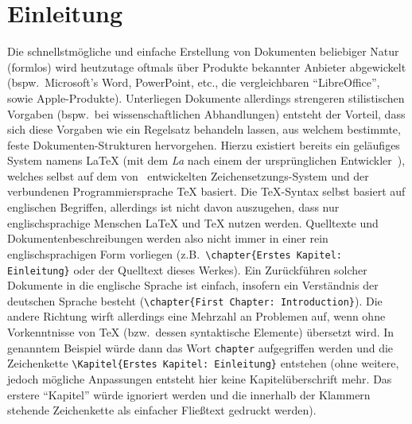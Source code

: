 \section{Einleitung}
Die schnellstmögliche und einfache Erstellung von Dokumenten beliebiger Natur (formlos) wird heutzutage oftmals über Produkte bekannter Anbieter abgewickelt (bspw.\ Microsoft's Word, PowerPoint, etc., die vergleichbaren \enquote{LibreOffice}, sowie Apple-Produkte).
Unterliegen Dokumente allerdings strengeren stilistischen Vorgaben (bspw.\ bei wissenschaftlichen Abhandlungen) entsteht der Vorteil, dass sich diese Vorgaben wie ein Regelsatz behandeln lassen, aus welchem bestimmte, feste Dokumenten-Strukturen hervorgehen. Hierzu existiert bereits ein geläufiges System namens \LaTeX{} (mit dem \textit{La} nach einem der ursprünglichen Entwickler~\cite{latexCompanion:leslieLamport}), welches selbst auf dem von~\cite{texbook} entwickelten Zeichensetzungs-System und der verbundenen Programmiersprache \TeX{} basiert.
Die \TeX{}-Syntax selbst basiert auf englischen Begriffen, allerdings ist nicht davon auszugehen, dass nur englischsprachige Menschen \LaTeX{} und \TeX{} nutzen werden. Quelltexte und Dokumentenbeschreibungen werden also nicht immer in einer rein englischsprachigen Form vorliegen (z.B.\ \verb|\chapter{Erstes Kapitel: Einleitung}| oder der Quelltext dieses Werkes). 
Ein Zurückführen solcher Dokumente in die englische Sprache ist einfach, insofern ein Verständnis der deutschen Sprache besteht (\verb|\chapter{First Chapter: Introduction}|). 
Die andere Richtung wirft allerdings eine Mehrzahl an Problemen auf, wenn ohne Vorkenntnisse von \TeX{} (bzw.\ dessen syntaktische Elemente) übersetzt wird. In genanntem Beispiel würde dann das Wort \texttt{chapter} aufgegriffen werden und die Zeichenkette \verb|\Kapitel{Erstes Kapitel: Einleitung}| entstehen (ohne weitere, jedoch mögliche Anpassungen entsteht hier keine Kapitelüberschrift mehr. Das erstere \enquote{Kapitel} würde ignoriert werden und die innerhalb der Klammern stehende Zeichenkette als einfacher Fließtext gedruckt werden). 

